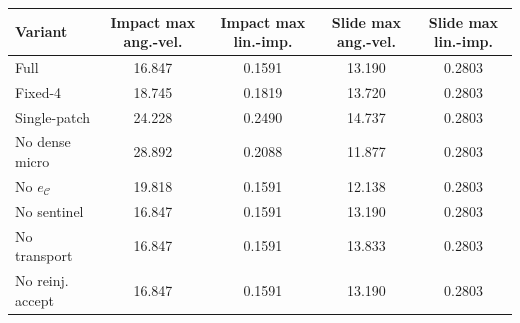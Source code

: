 \begin{tabular}{@{}lcccc@{}}
\toprule
Variant & Impact max ang.-vel. & Impact max lin.-imp. & Slide max ang.-vel. & Slide max lin.-imp. \\
\midrule
Full & 16.847 & 0.1591 & 13.190 & 0.2803 \\
Fixed-4 & 18.745 & 0.1819 & 13.720 & 0.2803 \\
Single-patch & 24.228 & 0.2490 & 14.737 & 0.2803 \\
No dense micro & 28.892 & 0.2088 & 11.877 & 0.2803 \\
No $e_{\mathcal{C}}$ & 19.818 & 0.1591 & 12.138 & 0.2803 \\
No sentinel & 16.847 & 0.1591 & 13.190 & 0.2803 \\
No transport & 16.847 & 0.1591 & 13.833 & 0.2803 \\
No reinj. accept & 16.847 & 0.1591 & 13.190 & 0.2803 \\
\bottomrule
\end{tabular}
